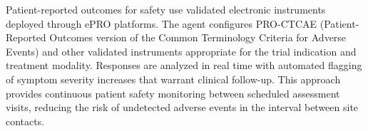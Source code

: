 Patient-reported outcomes for safety use validated electronic instruments deployed through
ePRO platforms. The agent configures PRO-CTCAE (Patient-Reported Outcomes version of the
Common Terminology Criteria for Adverse Events) and other validated instruments appropriate
for the trial indication and treatment modality. Responses are analyzed in real time with
automated flagging of symptom severity increases that warrant clinical follow-up. This
approach provides continuous patient safety monitoring between scheduled assessment visits,
reducing the risk of undetected adverse events in the interval between site contacts.
